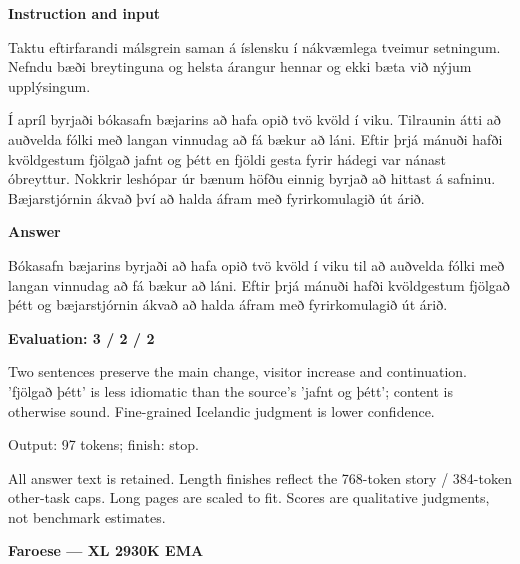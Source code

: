 \documentclass[10pt]{article}
\begin{document}
{\begin{minipage}{\textwidth}
\textbf{Instruction and input}\par Taktu eftirfarandi málsgrein saman á íslensku í nákvæmlega tveimur setningum. Nefndu bæði breytinguna og helsta árangur hennar og ekki bæta við nýjum upplýsingum.
\par\smallskip
Í apríl byrjaði bókasafn bæjarins að hafa opið tvö kvöld í viku. Tilraunin átti að auðvelda fólki með langan vinnudag að fá bækur að láni. Eftir þrjá mánuði hafði kvöldgestum fjölgað jafnt og þétt en fjöldi gesta fyrir hádegi var nánast óbreyttur. Nokkrir leshópar úr bænum höfðu einnig byrjað að hittast á safninu. Bæjarstjórnin ákvað því að halda áfram með fyrirkomulagið út árið.\par\smallskip
\textbf{Answer}\par Bókasafn bæjarins byrjaði að hafa opið tvö kvöld í viku til að auðvelda fólki með langan vinnudag að fá bækur að láni. Eftir þrjá mánuði hafði kvöldgestum fjölgað þétt og bæjarstjórnin ákvað að halda áfram með fyrirkomulagið út árið.\par\smallskip
\textbf{Evaluation: 3 / 2 / 2}\par Two sentences preserve the main change, visitor increase and continuation. 'fjölgað þétt' is less idiomatic than the source's 'jafnt og þétt'; content is otherwise sound. Fine-grained Icelandic judgment is lower confidence.
\par {\color{gray} Output: 97 tokens; finish: stop.}\par
\medskip\footnotesize All answer text is retained. Length finishes reflect the 768-token story / 384-token other-task caps. Long pages are scaled to fit. Scores are qualitative judgments, not benchmark estimates.
\end{minipage}}%
\noindent\ifdim\dimexpr\ht\languagepage+\dp\languagepage\relax>0.93\textheight%
\resizebox*{!}{0.93\textheight}{\usebox{\languagepage}}%
\else\usebox{\languagepage}\fi%
\clearpage
{\Large\bfseries Faroese --- XL 2930K EMA}\par\smallskip
\end{document}
